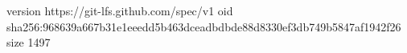 version https://git-lfs.github.com/spec/v1
oid sha256:968639a667b31e1eeedd5b463dceadbdbde88d8330ef3db749b5847af1942f26
size 1497
